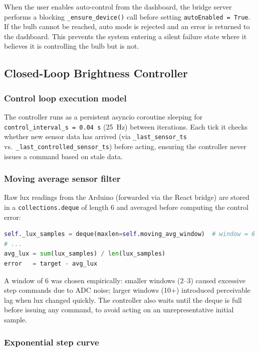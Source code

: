 \documentclass[12pt,letterpaper]{article}
\begin{document}
When the user enables auto-control from the dashboard, the bridge server
performs a blocking \texttt{\_ensure\_device()} call before setting
\texttt{autoEnabled = True}. If the bulb cannot be reached, auto mode is
rejected and an error is returned to the dashboard. This prevents the system
entering a silent failure state where it believes it is controlling the bulb
but is not.

\subsection{Closed-Loop Brightness Controller}

\subsubsection{Control loop execution model}

The controller runs as a persistent asyncio coroutine sleeping for
\texttt{control\_interval\_s = 0.04~s} (25~Hz) between iterations. Each tick
it checks whether new sensor data has arrived (via \texttt{\_last\_sensor\_ts}
vs.\ \texttt{\_last\_controlled\_sensor\_ts}) before acting, ensuring the
controller never issues a command based on stale data.

\subsubsection{Moving average sensor filter}

Raw lux readings from the Arduino (forwarded via the React bridge) are stored
in a \texttt{collections.deque} of length 6 and averaged before computing the
control error:

\begin{lstlisting}[language=Python, caption={Moving average smoothing}]
self._lux_samples = deque(maxlen=self.moving_avg_window)  # window = 6
# ...
avg_lux = sum(lux_samples) / len(lux_samples)
error   = target - avg_lux
\end{lstlisting}

A window of 6 was chosen empirically: smaller windows (2–3) caused excessive
step commands due to ADC noise; larger windows (10+) introduced perceivable
lag when lux changed quickly. The controller also waits until the deque is
full before issuing any command, to avoid acting on an unrepresentative
initial sample.

\subsubsection{Exponential step curve}
\end{document}
